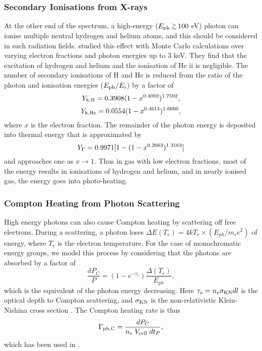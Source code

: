 \documentclass[useAMS,usenatbib]{mn2e}
\begin{document}
\subsubsection{Secondary Ionisations from X-rays}
\label{sec:xrays}

At the other end of the spectrum, a high-energy ($E_{\rm ph} \gsim
100$ eV) photon can ionise multiple neutral hydrogen and helium atoms,
and this should be considered in such radiation fields.
\citet{Shull85} studied this effect with Monte Carlo calculations over
varying electron fractions and photon energies up to 3 keV.  They find
that the excitation of hydrogen and helium and the ionisation of
He {\sc ii} is negligible.  The number of secondary ionisations of H
and He is reduced from the ratio of the photon and ionisation energies
($E_{\rm ph} / E_i$) by a factor of
%
\begin{equation}
  Y_{\rm k,H} = 0.3908 (1 - x^{0.4092})^{1.7592},
\end{equation}
\begin{equation}
  Y_{\rm k,He} = 0.0554 (1 - x^{0.4614})^{1.6660},
\end{equation}
where $x$ is the electron fraction.  The remainder of the photon
energy is deposited into thermal energy that is approximated by
%
\begin{equation}
  Y_{\rm \Gamma} = 0.9971 [ 1 - (1 - x^{0.2663})^{1.3163} ]
\end{equation}
and approaches one as $x \rightarrow 1$.  Thus in gas with low
electron fractions, most of the energy results in ionisations of
hydrogen and helium, and in nearly ionised gas, the energy goes into
photo-heating.

\subsubsection{Compton Heating from Photon Scattering}

High energy photons can also cause Compton heating by scattering off
free electrons.  During a scattering, a photon loses $\Delta E(T_e) =
4kT_e \times (E_{ph} / m_e c^2)$ of energy, where $T_e$ is the
electron temperature.  For the case of monochromatic energy groups, we
model this process by considering that the photons are absorbed by a
factor of 
\begin{equation}
  \label{eqn:compton}
  \frac{dP_C}{P} = (1 - e^{-\tau_e}) \frac{\Delta(T_e)}{E_{ph}},
\end{equation}
which is the equivalent of the photon energy decreasing.  Here $\tau_e
= n_e \sigma_{\rm KN} dl$ is the optical depth to Compton scattering,
and $\sigma_{\rm KN}$ is the non-relativistic Klein-Nishina cross
section \citep{Rybicki}.  The Compton heating rate is thus
\begin{equation}
  \Gamma_{\rm ph,C} = \frac{dP_C}{n_e \; V_{\rm cell} \; dt_P},
\end{equation}
which has been used in \citet{Kim11}.
\end{document}
